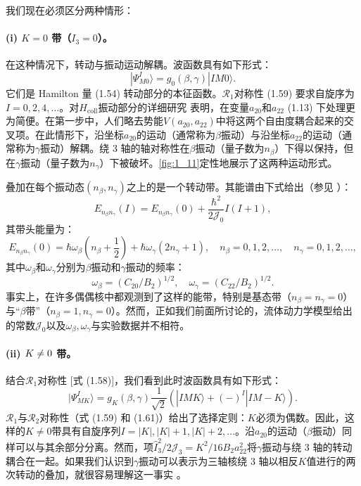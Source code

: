 我们现在必须区分两种情形：

\paragraph*{(i) $K=0$ 带（$I_{3}=0$）。}

在这种情况下，转动与振动运动解耦。波函数具有如下形式：
\begin{equation}
|\Psi^{I}_{M0}\rangle=g_{0}(\beta,\gamma)|IM0\rangle.\label{eq:1.63}
\end{equation}
它们是 Hamilton 量 (1.54) 转动部分的本征函数。$\mathscr{R}_{1}$对称性 (1.59) 要求自旋序为$I=0,2,4,\dots$。对$H_{\text{coll}}$振动部分的详细研究
\cite[第 I 卷第 6 章]{EG70} 表明，在变量$a_{20}$和$a_{22}$ (1.13)
下处理更为简便。在第一步中，人们略去势能$V(a_{20},a_{22})$中将这两个自由度耦合起来的交叉项。在此情形下，沿坐标$a_{20}$的运动（通常称为$\beta$振动）与沿坐标$a_{22}$的运动（通常称为$\gamma$振动）解耦。绕
3 轴的轴对称性在$\beta$振动（量子数为$n_{\beta}$）下得以保持，但在$\gamma$振动（量子数为$n_{\gamma}$）下被破坏。\ref{fig:1_11}定性地展示了这两种运动形式。

叠加在每个振动态$(n_{\beta},n_{\gamma})$之上的是一个转动带。其能谱由下式给出（参见 \cite[第 I 卷第 6 章]{EG70}）：
\begin{equation}
E_{n_{\beta}n_{\gamma}}(I)=E_{n_{\beta}n_{\gamma}}(0)+\frac{\hbar^{2}}{2\mathcal{J}_{0}}I(I+1),\label{eq:1.64}
\end{equation}
其带头能量为：
\begin{equation}
E_{n_{\beta}n_{\gamma}}(0)=\hbar\omega_{\beta}\left(n_{\beta}+\frac{1}{2}\right)+\hbar\omega_{\gamma}(2n_{\gamma}+1),\quad n_{\beta}=0,1,2,\dots,\quad n_{\gamma}=0,1,2,\dots,\label{eq:1.65}
\end{equation}
其中$\omega_{\beta}$和$\omega_{\gamma}$分别为$\beta$振动和$\gamma$振动的频率：
\[
\omega_{\beta}=(C_{20}/B_{2})^{1/2},\quad\omega_{\gamma}=(C_{22}/B_{2})^{1/2}.
\]
事实上，在许多偶偶核中都观测到了这样的能带，特别是基态带（$n_{\beta}=n_{\gamma}=0$）与“$\beta$带”（$n_{\beta}=1,n_{\gamma}=0$）。然而，正如我们前面所讨论的，流体动力学模型给出的常数$\mathcal{J}_{0}$以及$\omega_{\beta},\omega_{\gamma}$与实验数据并不相符。

\paragraph*{(ii) $K\protect\neq0$ 带。}

结合$\mathscr{R}_{1}$对称性 {[}式 (1.58){]}，我们看到此时波函数具有如下形式：
\begin{equation}
|\Psi^{I}_{MK}\rangle=g_{K}(\beta,\gamma)\frac{1}{\sqrt{2}}\left(|IMK\rangle+(-)^{I}|IM-K\rangle\right).\label{eq:1.66}
\end{equation}
$\mathscr{R}_{1}$与$\mathscr{R}_{2}$对称性（式 (1.59) 和 (1.61)）给出了选择定则：$K$必须为偶数。因此，这样的$K\neq0$带具有自旋序列$I=|K|,|K|+1,|K|+2,\dots$。沿$a_{20}$的运动（$\beta$振动）同样可以与其余部分分离。然而，项$\hat{I}^{2}_{3}/2\mathcal{J}_{3}=K^{2}/16B_{2}a^{2}_{22}$将$\gamma$振动与绕
3 轴的转动耦合在一起。如果我们认识到$\gamma$振动可以表示为三轴核绕 3 轴以相反$K$值进行的两次转动的叠加，就很容易理解这一事实
\cite[第 656 页]{BM75}。

